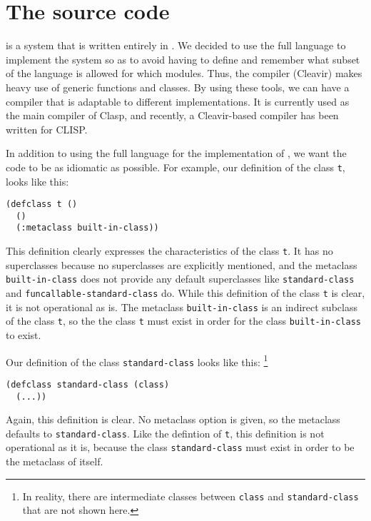 \section{The \sicl{} source code}

\sicl{} is a system that is written entirely in \commonlisp{}.  We
decided to use the full language to implement the system so as to
avoid having to define and remember what subset of the language is
allowed for which modules.  Thus, the compiler (Cleavir) makes heavy
use of generic functions and classes.  By using these tools, we can
have a compiler that is adaptable to different \commonlisp{}
implementations.  It is currently used as the main compiler of Clasp,
and recently, a Cleavir-based compiler has been written for CLISP.

In addition to using the full language for the implementation of
\sicl{}, we want the code to be as idiomatic as possible.  For
example, our definition of the class \texttt{t}, looks like this:

\begin{verbatim}
(defclass t ()
  ()
  (:metaclass built-in-class))
\end{verbatim}

This definition clearly expresses the characteristics of the class
\texttt{t}.  It has no superclasses because no superclasses are
explicitly mentioned, and the metaclass \texttt{built-in-class} does
not provide any default superclasses like \texttt{standard-class} and
\texttt{funcallable-standard-class} do.  While this definition of the
class \texttt{t} is clear, it is not operational as is.  The
metaclass \texttt{built-in-class} is an indirect subclass of the class
\texttt{t}, so the the class \texttt{t} must exist in order for the
class \texttt{built-in-class} to exist.

Our definition of the class \texttt{standard-class} looks like this:%
\footnote{In reality, there are intermediate classes between
  \texttt{class} and \texttt{standard-class} that are not shown here.}

\begin{verbatim}
(defclass standard-class (class)
  (...))
\end{verbatim}

Again, this definition is clear.  No metaclass option is given, so the
metaclass defaults to \texttt{standard-class}.  Like the defintion of
\texttt{t}, this definition is not operational as it is, because the
class \texttt{standard-class} must exist in order to be the metaclass
of itself.

